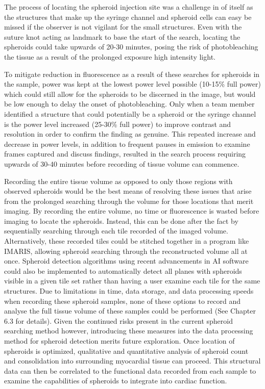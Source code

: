 The process of locating the spheroid injection site was a challenge in of itself as the structures that make up the syringe channel and spheroid cells can easy be missed if the observer is not vigilant for the small structures. Even with the suture knot acting as landmark to base the start of the search, locating the spheroids could take upwards of 20-30 minutes, posing the risk of photobleaching the tissue as a result of the prolonged exposure high intensity light. 

To mitigate reduction in fluorescence as a result of these searches for spheroids in the sample, power was kept at the lowest power level possible (10-15\% full power) which could still allow for the spheroids to be discerned in the image, but would be low enough to delay the onset of photobleaching. Only when a team member identified a structure that could potentially be a spheroid or the syringe channel is the power level increased (25-30\% full power) to improve contrast and resolution in order to confirm the finding as genuine. This repeated increase and decrease in power levels, in addition to frequent pauses in emission to examine frames captured and discuss findings, resulted in the search process requiring upwards of 30-40 minutes before recording of tissue volume can commence. 

Recording the entire tissue volume as opposed to only those regions with observed spheroids would be the best means of resolving these issues that arise from the prolonged searching through the volume for those locations that merit imaging. By recording the entire volume, no time or fluorescence is wasted before imaging to locate the spheroids. Instead, this can be done after the fact by sequentially searching through each tile recorded of the imaged volume. Alternatively, these recorded tiles could be stitched together in a program like IMARIS, allowing spheroid searching through the reconstructed volume all at once. Spheroid detection algorithms using recent advancements in AI software could also be implemented to automatically detect all planes with spheroids visible in a given tile set rather than having a user examine each tile for the same structures. Due to limitations in time, data storage, and data processing speeds when recording these spheroid samples, none of these options to record and analyse the full tissue volume of these samples could be performed (See Chapter 6.3 for details). Given the continued risks present in the current spheroid searching method however, introducing these measures into the data processing method for spheroid detection merits future exploration. Once location of spheroids is optimized, qualitative and quantitative analysis of spheroid count and consolidation into surrounding myocardial tissue can proceed. This structural data can then be correlated to the functional data recorded from each sample to examine the capabilities of spheroids to integrate into cardiac function. 



